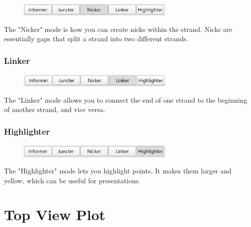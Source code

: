 \documentclass[titlepage]{article}
\begin{document}
	\begin{figure}[h]
		\centering
		\includegraphics[width=3in]{"nicker-activated.png"}
		\label{fig:nicker-activated}
	\end{figure}

	The "Nicker" mode is how you can create nicks within the strand. Nicks are essentially gaps that split a strand into two different strands.

	\subsubsection{Linker}

	\begin{figure}[h]
		\centering
		\includegraphics[width=3in]{"linker-activated.png"}
		\label{fig:linker-activated}
	\end{figure}

	The "Linker" mode allows you to connect the end of one strand to the beginning of another strand, and vice versa.

	\subsubsection{Highlighter}

	\begin{figure}[h]
		\centering
		\includegraphics[width=3in]{"highlighter-activated.png"}
		\label{fig:highlighter-activated}
	\end{figure}

	The "Highlighter" mode lets you highlight points. It makes them larger and yellow, which can be useful for presentations.
	
	\section{Top View Plot}
	
\end{document}
